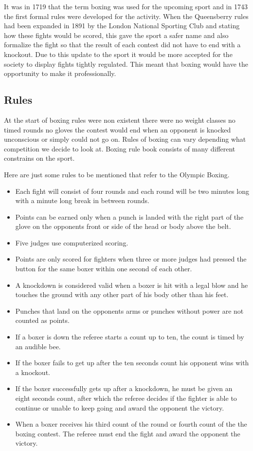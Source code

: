 \documentclass[a4paper,12pt]{report}
\begin{document}
It was in 1719 that the term boxing was used for the upcoming sport and in 1743 the first formal rules were developed for the activity. When the Queensberry rules had been expanded in 1891 by the London National Sporting Club and stating how these fights would be scored, this gave the sport a safer name and also formalize the fight so that the result of each contest did not have to end with a knockout.
\cite{modernBoxing}
Due to this update to the sport it would be more accepted for the society to display fights tightly regulated. This meant that boxing would have the opportunity to make it professionally. 

\subsection{Rules}
At the start of boxing rules were non existent there were no weight classes no timed rounds no gloves the contest would end when an opponent is knocked unconscious or simply could not go on. 
Rules of boxing can vary depending what competition we decide to look at. Boxing rule book consists of many different constrains on the sport.\linebreak

Here are just some rules to be mentioned that refer to the Olympic Boxing.
\begin{itemize}
    \item Each fight will consist of four rounds and each round will be two minutes long with a minute long break in between rounds.
    \item Points can be earned only when a punch is landed with the right part of the glove on the opponents front or side of the head or body above the belt.
    \item Five judges use computerized scoring.
    \item Points are only scored for fighters when three or more judges had pressed the button for the same boxer within one second of each other.
    \item A knockdown is considered valid when a boxer is hit with a legal blow and he touches the ground with any other part of his body other than his feet.
    \item Punches  that land on the opponents arms or punches without power are not counted as points.
    \item If a boxer is down the referee starts a count up to ten, the count is timed by an audible bee.
    \item If the boxer fails to get up after the ten seconds count his opponent wins with a knockout.
    \item If the boxer successfully gets up after a knockdown, he must be given an eight seconds count, after which the referee decides if the fighter is able to continue or unable to keep going and award the opponent the victory.
    \item When a boxer receives his third count of the round or fourth count of the the boxing contest. The referee must end the fight and award the opponent the victory.
\end{itemize}
\cite{lewandowski2012olympic}
\end{document}
